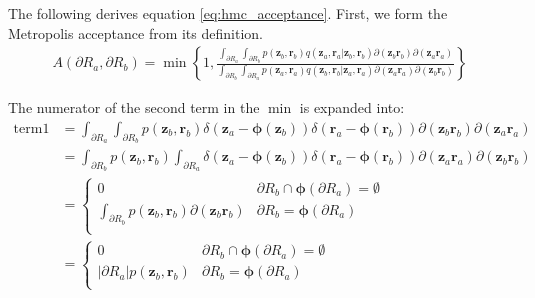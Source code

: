 \documentclass[a4]{article}
\begin{document}
The following derives equation \ref{eq:hmc_acceptance}.
First, we form the Metropolis acceptance from its definition.
\begin{equation}
\begin{aligned}
A({\partial}R_a, {\partial}R_b) = \min \left\{
1,
\frac{
    \int_{{\partial}R_a} \int_{{\partial}R_b}
        p( \bm{z}_b, \bm{r}_b ) q( \bm{z}_a, \bm{r}_a | \bm{z}_b, \bm{r}_b )
    \partial(\bm{z}_b\bm{r}_b) \partial(\bm{z}_a\bm{r}_a)
}
{
    \int_{{\partial}R_b} \int_{{\partial}R_a}
        p( \bm{z}_a, \bm{r}_a ) q( \bm{z}_b, \bm{r}_b | \bm{z}_a, \bm{r}_a )
    \partial(\bm{z}_a\bm{r}_a) \partial(\bm{z}_b\bm{r}_b)
}
\right\}\label{eq:hmc_acceptance2}
\end{aligned}
\end{equation}

The numerator of the second term in the $\min$ is expanded into:
\begin{equation}
\begin{aligned}
\text{term1} &=
    \int_{{\partial}R_a} \int_{{\partial}R_b}
        p( \bm{z}_b, \bm{r}_b )
        \delta\left(\bm{z}_a - \bm{\phi}(\bm{z}_b)\right)
        \delta\left(\bm{r}_a - \bm{\phi}(\bm{r}_b)\right)
    \partial(\bm{z}_b\bm{r}_b) \partial(\bm{z}_a\bm{r}_a)\\
&=
    \int_{{\partial}R_b}
        p( \bm{z}_b, \bm{r}_b )
    \int_{{\partial}R_a} 
        \delta\left(\bm{z}_a - \bm{\phi}(\bm{z}_b)\right)
        \delta\left(\bm{r}_a - \bm{\phi}(\bm{r}_b)\right)
    \partial(\bm{z}_a\bm{r}_a)
    \partial(\bm{z}_b\bm{r}_b)\\
&=
    \begin{cases}
        0 & {\partial}R_b \cap \bm{\phi}({\partial}R_a) = \emptyset\\
        \int_{{\partial}R_b}p( \bm{z}_b, \bm{r}_b )\partial(\bm{z}_b\bm{r}_b)
        & {\partial}R_b = \bm{\phi}({\partial}R_a)\\
    \end{cases}\\
&=
    \begin{cases}
        0 & {\partial}R_b \cap \bm{\phi}({\partial}R_a) = \emptyset\\
        \left|{\partial}R_a\right|p( \bm{z}_b, \bm{r}_b )
        & {\partial}R_b = \bm{\phi}({\partial}R_a)\\
    \end{cases}
\end{aligned}
\end{equation}
\end{document}
